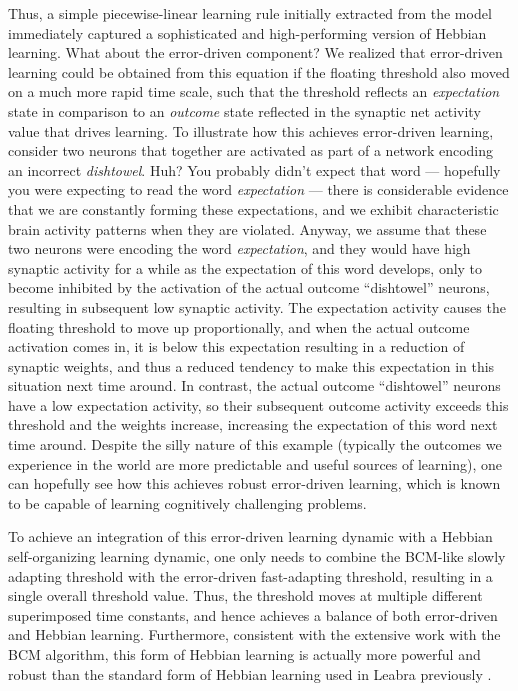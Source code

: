 \documentclass[11pt,twoside]{article}
\begin{document}
Thus, a simple piecewise-linear learning rule initially extracted from the
 model immediately captured a sophisticated
and high-performing version of Hebbian learning. What about the error-driven
component?  We realized that error-driven learning could be obtained from this
equation if the floating threshold also moved on a much more rapid time scale,
such that the threshold reflects an {\em expectation} state in comparison to
an {\em outcome} state reflected in the synaptic net activity value that
drives learning.  To illustrate how this achieves error-driven learning,
consider two neurons that together are activated as part of a network encoding
an incorrect {\em dishtowel}.  Huh?  You probably didn't expect that word ---
hopefully you were expecting to read the word {\em expectation} --- there is
considerable evidence that we are constantly forming these expectations, and
we exhibit characteristic brain activity patterns when they are violated.  Anyway, we assume that these two neurons were encoding the word
{\em expectation}, and they would have high synaptic activity for a while as
the expectation of this word develops, only to become inhibited by the
activation of the actual outcome ``dishtowel'' neurons, resulting in
subsequent low synaptic activity.  The expectation activity causes the
floating threshold to move up proportionally, and when the actual outcome
activation comes in, it is below this expectation resulting in a reduction of
synaptic weights, and thus a reduced tendency to make this expectation in this
situation next time around.  In contrast, the actual outcome ``dishtowel''
neurons have a low expectation activity, so their subsequent outcome activity
exceeds this threshold and the weights increase, increasing the expectation of
this word next time around.  Despite the silly nature of this example
(typically the outcomes we experience in the world are more predictable and
useful sources of learning), one can hopefully see how this achieves robust
error-driven learning, which is known to be capable of learning cognitively
challenging problems.

To achieve an integration of this error-driven learning dynamic with a Hebbian
self-organizing learning dynamic, one only needs to combine the BCM-like
slowly adapting threshold with the error-driven fast-adapting threshold,
resulting in a single overall threshold value.  Thus, the threshold moves at
multiple different superimposed time constants, and hence achieves a balance
of both error-driven and Hebbian learning.  Furthermore, consistent with the
extensive work with the BCM algorithm, this form of Hebbian learning is
actually more powerful and robust than the standard form of Hebbian learning
used in Leabra previously \cite{BlairIntratorShouvalEtAl98}.
\end{document}
